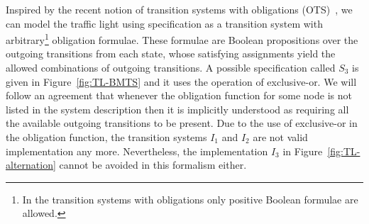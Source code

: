 Inspired by the recent notion of transition systems with 
obligations (OTS)~\cite{benes_et_al:OASIcs:2011:3070}, 
we can model the traffic light using specification
as a transition system with arbitrary\footnote{In the transition
systems with obligations only positive Boolean formulae are allowed.} 
obligation formulae. These formulae are Boolean
propositions over the outgoing transitions from each state,
whose satisfying assignments yield the allowed combinations
of outgoing transitions.
A possible specification called $S_3$ is given 
in Figure~\ref{fig:TL-BMTS} and it uses the operation of exclusive-or. 
We will follow an agreement that whenever the obligation function for some node 
is not listed in the system description then it is implicitly understood as 
requiring all the available outgoing transitions to be present.
Due to the use of exclusive-or in the obligation function, 
the transition systems $I_1$ and $I_2$ are not valid implementation any more. 
Nevertheless, the implementation $I_3$ 
in Figure~\ref{fig:TL-alternation} cannot be avoided in this
formalism either. 

